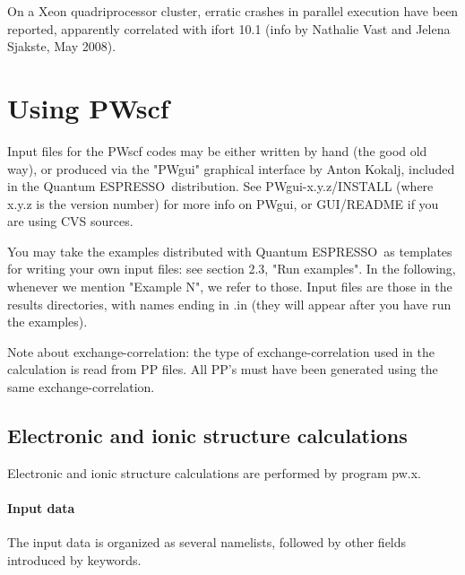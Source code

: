 \documentclass[12pt,a4paper]{article}
\def\qe{{\sc Quantum ESPRESSO}}
\begin{document}
On a Xeon quadriprocessor cluster, erratic crashes in parallel
execution have been reported, apparently correlated with ifort 10.1
(info by Nathalie Vast and Jelena Sjakste, May 2008).

\section{Using PWscf}

Input files for the PWscf codes may be either written by hand (the good old
way), or produced via the "PWgui" graphical interface by Anton Kokalj, 
included in the \qe\ distribution. See PWgui-x.y.z/INSTALL
(where x.y.z is the version number) for more info on PWgui, or GUI/README
if you are using CVS sources.
    
You may take the examples distributed with \qe\ as
templates for writing your own input files: see section 2.3, "Run examples".
In the following, whenever we mention "Example N", we refer to those. Input
files are those in the results directories, with names ending in .in 
(they will appear after you have run the examples).
    
Note about exchange-correlation: the type of exchange-correlation used
in the calculation is read from PP files. All PP's must have been generated
using the same exchange-correlation.

\subsection{Electronic and ionic structure calculations}

Electronic and ionic structure calculations are performed by program pw.x.

\paragraph{Input data}

The input data is organized as several namelists, followed by other fields
introduced by keywords.
    
\end{document}
